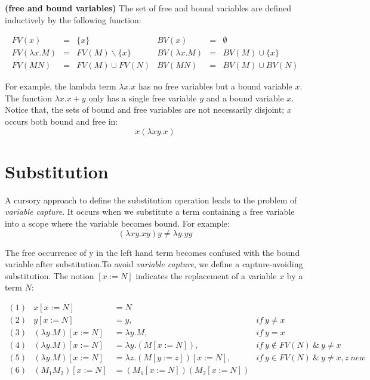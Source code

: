 \begin{def1}
\normalfont \textbf{(free and bound variables)} The set of free and bound variables are defined inductively by the following function:
\end{def1}

\begin{equation*}\label{eq:fv}
\begin{array}{lcllcl}
FV(x)           & = & \{x\}             & BV(x)           &=& \emptyset\\
FV(\lambda x.M) & = & FV(M)\backslash \{x\} & BV(\lambda x.M) &=& BV(M)\cup \{x\}\\
FV(MN)          & = & FV(M)\cup FV(N) & BV(MN)          &=& BV(M)\cup BV(N)
\end{array}
\end{equation*}


For example, the lambda term $\lambda x.x$ has no free variables but a bound variable $x$. The function $\lambda x.x+y$ only has a single free variable $y$ and a bound variable $x$. 
Notice that, the sets of bound and free variables are not necessarily disjoint; $x$ occurs both bound and free in:
\begin{equation*}
x(\lambda xy.x)
\end{equation*}


\section{Substitution}

\noindent A cursory approach to define the substitution operation leads to the problem of \textit{variable capture}. It occurs when we substitute a term containing a free variable into a scope where the variable becomes bound. For example:
\begin{equation*}
(\lambda xy.xy)y \neq \lambda y.yy
\end{equation*} 

The free occurrence of y in the left hand term becomes confused with the bound variable after substitution.To avoid \textit{variable capture}, we define a capture-avoiding substitution. The notion $[x:=N]$ indicates the replacement of a variable $x$ by a term $N$:

\begin{equation*}
\begin{array}{lrll}
(1)&x[x:=N]&=N & ~\\
(2)&y[x:=N]&=y,& if\ y\neq x\\
(3)&(\lambda y.M)[x:=N]&=\lambda y.M,& if\ y=x\\
(4)&(\lambda y.M)[x:=N]&=\lambda y.(M[x:=N]),& if\ y\notin FV(N)\ \& \ y\neq x\\
(5)&(\lambda y.M)[x:=N]&=\lambda z.(M[y:=z])[x:=N],& if\ y\in FV(N)\ \& \ y\neq x,z\  new\\
(6)&(M_1M_2)[x:=N] &= (M_1[x:=N])(M_2[x:=N])&
\end{array}
\end{equation*}

